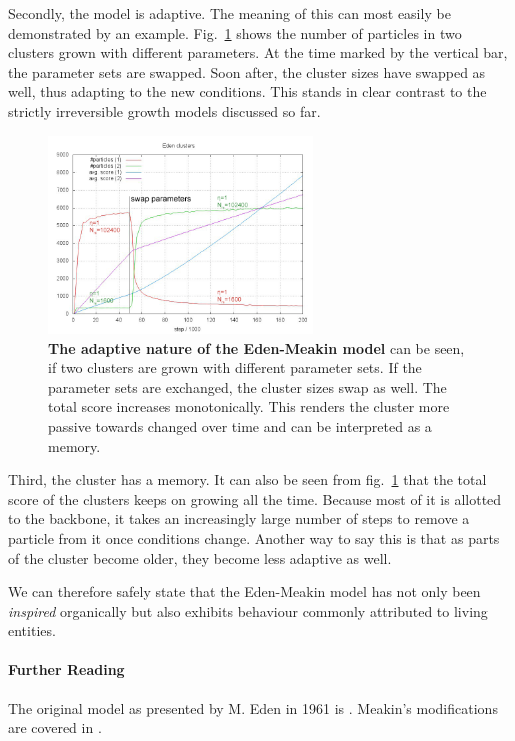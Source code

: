 \documentclass[twocolumn, 10pt]{scrartcl}
\begin{document}
        Secondly, the model is adaptive. The meaning of this can most easily be demonstrated by an example.
        Fig.~\ref{fig-edenadap} shows the number of particles in two clusters grown with different parameters.
        At the time marked by the vertical bar, the parameter sets are swapped. Soon after, the cluster
        sizes have swapped as well, thus adapting to the new conditions. This stands in clear contrast to the
        strictly irreversible growth models discussed so far.
        \begin{figure}
            \center
            \includegraphics[width=7cm]{img/edenadap.png}
            \caption[The adaptive nature of the Eden-Meakin model]
                {\small\textbf{The adaptive nature of the Eden-Meakin model} can be seen, if two clusters are
                grown with different parameter sets. If the parameter sets are exchanged, the cluster sizes
                swap as well. The total score increases monotonically. This renders the cluster more passive
                towards changed over time and can be interpreted as a memory.}
            \label{fig-edenadap}
        \end{figure}

        Third, the cluster has a memory. It can also be seen from fig.~\ref{fig-edenadap} that the total score
        of the clusters keeps on growing all the time. Because most of it is allotted to the backbone, it
        takes an increasingly large number of steps to remove a particle from it once conditions change.
        Another way to say this is that as parts of the cluster become older, they become less adaptive as well.

        We can therefore safely state that the Eden-Meakin model has not only been \emph{inspired} organically
        but also exhibits behaviour commonly attributed to living entities.

        {\small
            \paragraph{Further Reading}
            The original model as presented by M. Eden in 1961 is \cite{src-eden}. Meakin's modifications are
            covered in \cite{src-meakin-eden}.
        }
\end{document}
